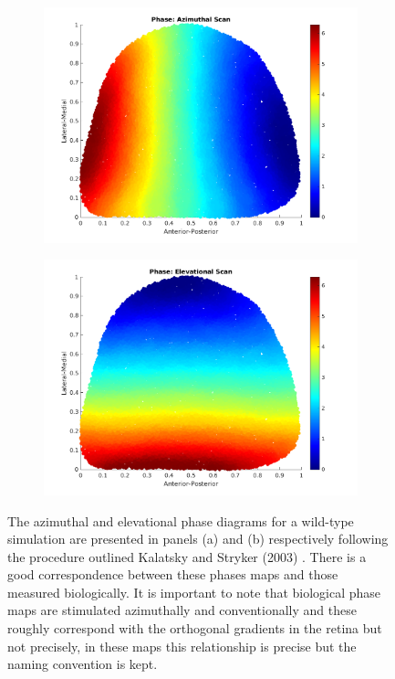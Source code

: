 \begin{figure}[h]
	\begin{subfigure}{0.5\textwidth}
		\centering
		\includegraphics[width=\textwidth]{images/lattice/WT1}
		\caption{}
	\end{subfigure}
	\begin{subfigure}{0.5\textwidth}
		\centering
		\includegraphics[width=\textwidth]{images/lattice/WT2}
		\caption{}
	\end{subfigure}
	\def\c{The azimuthal and elevational phase diagrams for a wild-type simulation. }
	\caption[\c]{The azimuthal and elevational phase diagrams for a wild-type simulation are presented in panels (a) and (b) respectively following the procedure outlined Kalatsky and Stryker (2003) \cite{Kalatsky2003-cz}. There is a good correspondence between these phases maps and those measured biologically. It is important to note that biological phase maps are stimulated azimuthally and conventionally and these roughly correspond with the orthogonal gradients in the retina but not precisely, in these maps this relationship is precise but the naming convention is kept.} \label{fig:activitydem}
\end{figure}
\FloatBarrier
	

